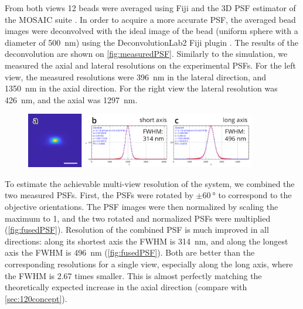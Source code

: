     From both views 12 beads were averaged using Fiji \cite{schindelin_fiji:_2012} and the 3D PSF estimator of the MOSAIC suite \cite{cardinale_imagej_2010}. In order to acquire a more accurate PSF, the averaged bead images were deconvolved with the ideal image of the bead (uniform sphere with a diameter of \SI{500}{nm}) using the DeconvolutionLab2 Fiji plugin \cite{sage_deconvolutionlab2:_2017}. The results of the deconvolution are shown on \autoref{fig:measuredPSF}. Similarly to the simulation, we measured the axial and lateral resolutions on the experimental PSFs. For the left view, the measured resolutions were \SI{396}{nm} in the lateral direction, and \SI{1350}{nm} in the axial direction. For the right view the lateral resolution was \SI{426}{nm}, and the axial was \SI{1297}{nm}.

    \begin{figure}
      \centering
      \includegraphics[width=0.9\textwidth]{beads/fusedPSF}
      \label{fig:fusedPSF}
    \end{figure}
    
    To estimate the achievable multi-view resolution of the system, we combined the two measured PSFs. First, the PSFs were rotated by $\pm \SI{60}{\degree}$ to correspond to the objective orientations. The PSF images were then normalized by scaling the maximum to 1, and the two rotated and normalized PSFs were multiplied (\autoref{fig:fusedPSF}). Resolution of the combined PSF is much improved in all directions: along its shortest axis the FWHM is \SI{314}{nm}, and along the longest axis the FWHM is \SI{496}{nm} (\autoref{fig:fusedPSF}). Both are better than the corresponding resolutions for a single view, especially along the long axis, where the FWHM is 2.67 times smaller. This is almost perfectly matching the theoretically expected increase in the axial direction (compare with \autoref{sec:120concept}).


